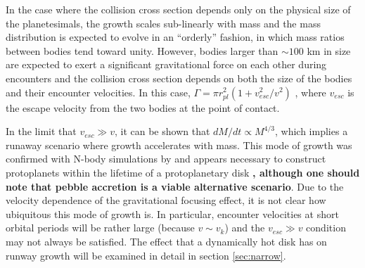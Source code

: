 \documentclass[twocolumn,linenumbers]{aastex63}
\begin{document}
In the case where the collision cross section depends only
on the physical size of the planetesimals, the growth scales sub-linearly
with mass and the mass distribution is expected to evolve in an
``orderly'' fashion, in which mass ratios between bodies tend toward unity. However, bodies larger than $\sim 100$ km in size are expected to exert a significant gravitational force on each other during encounters and the collision cross section depends on both the size of the bodies and their encounter velocities. In this case, $\Gamma = \pi r_{pl}^2 \left( 1 + v_{esc}^2 / v^2 \right)$ \citep{safronov69}, where $v_{esc}$ is the escape velocity from the two bodies at the point of contact.

In the limit that $v_{esc} \gg v$, it can be shown that $dM/dt \propto
M^{4/3}$, which implies a runaway scenario where growth
accelerates with mass. This mode of growth was confirmed with N-body
simulations by \citet{kokubo96} and appears necessary to construct
protoplanets within the lifetime of a protoplanetary disk \textbf{\citep{lissauer87}, although one should note that pebble accretion \citep{lambrechts12, lambrechts14, bitsch15} is a viable alternative scenario}. Due to the
velocity dependence of the gravitational focusing effect, it is not clear how ubiquitous this mode of growth is. In particular, encounter velocities at short orbital periods will be rather large (because $v \sim v_{k}$) and the $v_{esc} \gg v$ condition may not always be satisfied. The effect that a dynamically hot disk has on runway growth will be examined in detail in section \ref{sec:narrow}.
\end{document}
